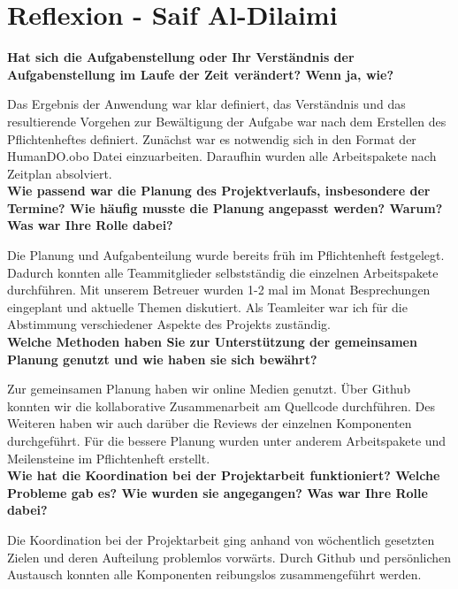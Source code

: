 \appendix 
{}


\chapter{Reflexion - Saif Al-Dilaimi}
\textbf{Hat sich die Aufgabenstellung oder Ihr Verständnis der Aufgabenstellung im Laufe
der Zeit verändert? Wenn ja, wie?}

Das Ergebnis der Anwendung war klar definiert, das Verständnis und das resultierende
Vorgehen zur Bewältigung der Aufgabe war nach dem Erstellen des Pflichtenheftes definiert.
Zunächst war es notwendig sich in den Format der HumanDO.obo Datei einzuarbeiten. Daraufhin wurden alle Arbeitspakete nach Zeitplan absolviert.
\\

\textbf{Wie passend war die Planung des Projektverlaufs, insbesondere der Termine? Wie
häufig musste die Planung angepasst werden? Warum? Was war Ihre Rolle dabei?}

Die Planung und Aufgabenteilung wurde bereits früh im Pflichtenheft festgelegt. Dadurch konnten alle Teammitglieder selbstständig die einzelnen Arbeitspakete durchführen. Mit unserem Betreuer wurden 1-2 mal im Monat Besprechungen eingeplant und aktuelle Themen diskutiert. Als Teamleiter war ich für die Abstimmung verschiedener Aspekte des Projekts zuständig.
\\

\textbf{Welche Methoden haben Sie zur Unterstützung der gemeinsamen Planung genutzt
und wie haben sie sich bewährt?}

Zur gemeinsamen Planung haben wir online Medien genutzt. Über Github konnten wir die kollaborative Zusammenarbeit am Quellcode durchführen. Des Weiteren haben wir auch darüber die Reviews der einzelnen Komponenten durchgeführt. Für die bessere Planung wurden unter anderem Arbeitspakete und Meilensteine im Pflichtenheft erstellt.
\\

\textbf{Wie hat die Koordination bei der Projektarbeit funktioniert? Welche Probleme gab
es? Wie wurden sie angegangen? Was war Ihre Rolle dabei?}

Die Koordination bei der Projektarbeit ging anhand von wöchentlich gesetzten Zielen und
deren Aufteilung problemlos vorwärts. Durch Github und persönlichen Austausch konnten alle Komponenten reibungslos zusammengeführt werden.
\\

